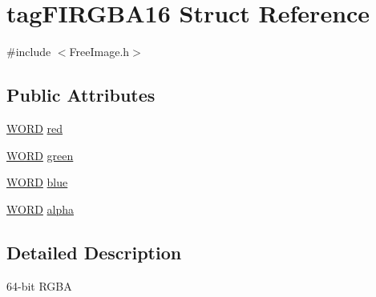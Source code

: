\hypertarget{structtag_f_i_r_g_b_a16}{\section{tag\-F\-I\-R\-G\-B\-A16 Struct Reference}
\label{structtag_f_i_r_g_b_a16}
}


{\ttfamily \#include $<$Free\-Image.\-h$>$}

\subsection*{Public Attributes}
\begin{DoxyCompactItemize}
\item 
\hyperlink{_free_image_8h_ab24077addd3b7b13e086987ff296552c}{W\-O\-R\-D} \hyperlink{structtag_f_i_r_g_b_a16_a580143c8b2f5e28721972342a6facd01}{red}
\item 
\hyperlink{_free_image_8h_ab24077addd3b7b13e086987ff296552c}{W\-O\-R\-D} \hyperlink{structtag_f_i_r_g_b_a16_a0ae72ef6b7fe786b9ea6068579cd3f2d}{green}
\item 
\hyperlink{_free_image_8h_ab24077addd3b7b13e086987ff296552c}{W\-O\-R\-D} \hyperlink{structtag_f_i_r_g_b_a16_afe4aa863b00988ad24831a1432ef837e}{blue}
\item 
\hyperlink{_free_image_8h_ab24077addd3b7b13e086987ff296552c}{W\-O\-R\-D} \hyperlink{structtag_f_i_r_g_b_a16_a9875250254b19efbfb321bf33ae2fdf6}{alpha}
\end{DoxyCompactItemize}


\subsection{Detailed Description}
64-\/bit R\-G\-B\-A 

